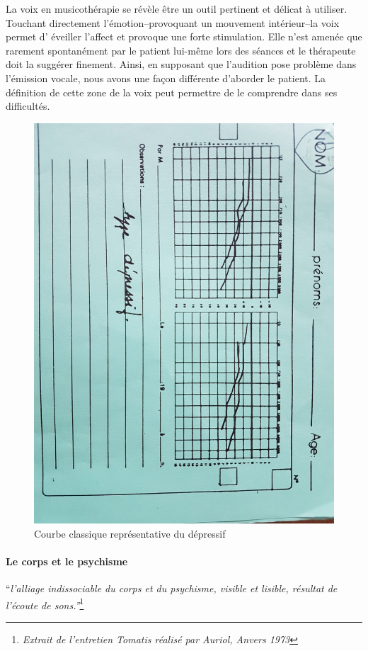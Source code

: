 La voix en musicothérapie se révèle être un outil pertinent et délicat
à utiliser. Touchant 
directement 
l'émotion--provoquant un mouvement intérieur--la voix permet d'
éveiller l'affect
et provoque une forte stimulation. Elle n'est amenée que rarement
spontanément par le patient lui-même lors des séances et le thérapeute doit la suggérer
finement.
Ainsi, en supposant que l'audition pose problème dans l'émission
vocale, nous avons une façon différente d'aborder le patient. La
définition de cette
zone de la voix peut permettre de le comprendre dans ses difficultés. 

  \begin{figure}
	\centering
	\includegraphics[width=0.7\linewidth]{images/courbedepressif.jpg}
	\caption[Exemple d'une courbe de dépressif]{Courbe classique représentative du dépressif}
       
	\label{groupecontroleimage1}
\end{figure}




  

\paragraph{Le corps et le psychisme}

``\emph{l'alliage indissociable du corps et du psychisme, 
visible et lisible, résultat de l'écoute de sons.''}\footnote{\emph{Extrait de l'entretien Tomatis réalisé par Auriol, Anvers 1973}}



